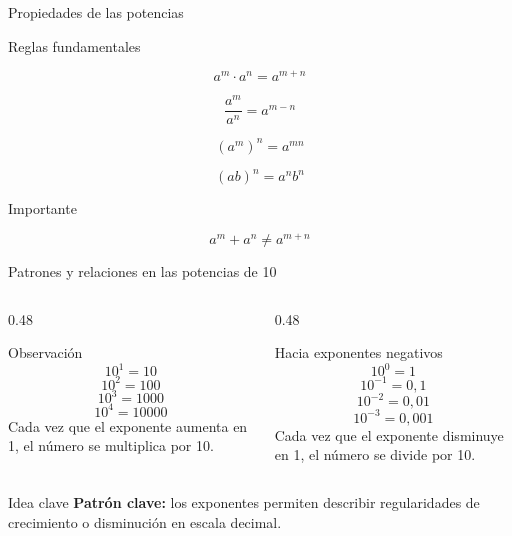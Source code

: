 \documentclass[aspectratio=169,10pt,handout]{beamer}
\newenvironment{ideaBox}
{\begin{exampleblock}{Idea clave}}
	{\end{exampleblock}}
\begin{document}
	\begin{frame}{Propiedades de las potencias}
		
		\begin{block}{Reglas fundamentales}
			
			\[
			a^m \cdot a^n = a^{m+n}
			\]
			
			\[
			\frac{a^m}{a^n} = a^{m-n}
			\]
			
			\[
			(a^m)^n = a^{mn}
			\]
			
			\[
			(ab)^n = a^n b^n
			\]
			
		\end{block}
		
		\pause
		
		\begin{alertblock}{Importante}
			
			\[
			a^m + a^n \neq a^{m+n}
			\]
			
		\end{alertblock}
		
	\end{frame}
	
	\begin{frame}{Patrones y relaciones en las potencias de 10}
		\begin{columns}[T,totalwidth=\textwidth]
			\begin{column}{0.48\textwidth}
				\begin{block}{Observación}
					\[
					10^1 = 10
					\]
					\[
					10^2 = 100
					\]
					\[
					10^3 = 1000
					\]
					\[
					10^4 = 10000
					\]
					Cada vez que el exponente aumenta en 1, el número se multiplica por 10.
				\end{block}
			\end{column}
			
			\begin{column}{0.48\textwidth}
				\begin{exampleblock}{Hacia exponentes negativos}
					\[
					10^0 = 1
					\]
					\[
					10^{-1} = 0{,}1
					\]
					\[
					10^{-2} = 0{,}01
					\]
					\[
					10^{-3} = 0{,}001
					\]
					Cada vez que el exponente disminuye en 1, el número se divide por 10.
				\end{exampleblock}
			\end{column}
		\end{columns}
		
		\vspace{0.2cm}
		\begin{ideaBox}
			\textbf{Patrón clave:} los exponentes permiten describir regularidades de crecimiento o disminución en escala decimal.
		\end{ideaBox}
	\end{frame}
	
\end{document}
